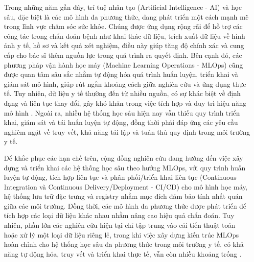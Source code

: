 
Trong những năm gần đây, trí tuệ nhân tạo (Artificial Intelligence - AI) và học sâu, đặc biệt là các mô hình đa phương thức, đang phát triển một cách mạnh mẽ trong lĩnh vực chăm sóc sức khỏe. Chúng được ứng dụng rộng rãi để hỗ trợ các công tác trong chẩn đoán bệnh như khai thác dữ liệu, trích xuất dữ liệu về hình ảnh y tế, hồ sơ và kết quả xét nghiệm, điều này giúp tăng độ chính xác và cung cấp cho bác sĩ thêm nguồn lực trong quá trình ra quyết định. Bên cạnh đó, các phương pháp vận hành học máy (Machine Learning Operations - MLOps) cũng được quan tâm sâu sắc nhằm tự động hóa quá trình huấn luyện, triển khai và giám sát mô hình, giúp rút ngắn khoảng cách giữa nghiên cứu và ứng dụng thực tế. Tuy nhiên, dữ liệu y tế thường đến từ nhiều nguồn, có sự khác biệt về định dạng và liên tục thay đổi, gây khó khăn trong việc tích hợp và duy trì hiệu năng mô hình \cite{mlops_healthcare_slr_2025}. Ngoài ra, nhiều hệ thống học sâu hiện nay vẫn thiếu quy trình triển khai, giám sát và tái huấn luyện tự động, đồng thời phải đáp ứng các yêu cầu nghiêm ngặt về truy vết, khả năng tái lập và tuân thủ quy định trong môi trường y tế.

Để khắc phục các hạn chế trên, cộng đồng nghiên cứu đang hướng đến việc xây dựng và triển khai các hệ thống học sâu theo hướng MLOps, với quy trình huấn luyện tự động, tích hợp liên tục và phân phối/triển khai liên tục (Continuous Integration và Continuous Delivery/Deployment - CI/CD) cho mô hình học máy, hệ thống lưu trữ đặc trưng và registry nhằm mục đích đảm bảo tính nhất quán giữa các môi trường. Đồng thời, các mô hình đa phương thức được phát triển để tích hợp các loại dữ liệu khác nhau nhằm nâng cao hiệu quả chẩn đoán. Tuy nhiên, phần lớn các nghiên cứu hiện tại chỉ tập trung vào cải tiến thuật toán hoặc xử lý một loại dữ liệu riêng lẻ, trong khi việc xây dựng kiến trúc MLOps hoàn chỉnh cho hệ thống học sâu đa phương thức trong môi trường y tế, có khả năng tự động hóa, truy vết và triển khai thực tế, vẫn còn nhiều khoảng trống \cite{Rajpurkar2022}.

